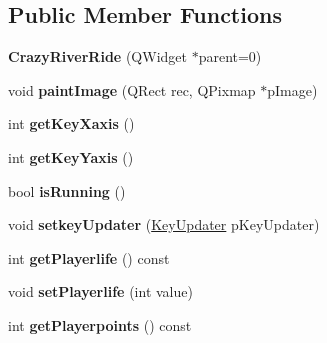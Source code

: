 \subsection*{Public Member Functions}
\begin{DoxyCompactItemize}
\item 
\hypertarget{class_crazy_river_ride_ae7676b37caf1b9f9687eb1de0b426b77}{{\bfseries Crazy\-River\-Ride} (Q\-Widget $\ast$parent=0)}\label{class_crazy_river_ride_ae7676b37caf1b9f9687eb1de0b426b77}

\item 
\hypertarget{class_crazy_river_ride_a6f69c5acd7124489c8e95024debec646}{void {\bfseries paint\-Image} (Q\-Rect rec, Q\-Pixmap $\ast$p\-Image)}\label{class_crazy_river_ride_a6f69c5acd7124489c8e95024debec646}

\item 
\hypertarget{class_crazy_river_ride_a915fc6fab259b6fa24b09e64b7710e9c}{int {\bfseries get\-Key\-Xaxis} ()}\label{class_crazy_river_ride_a915fc6fab259b6fa24b09e64b7710e9c}

\item 
\hypertarget{class_crazy_river_ride_a175a99b902ffc945943acc281fb28165}{int {\bfseries get\-Key\-Yaxis} ()}\label{class_crazy_river_ride_a175a99b902ffc945943acc281fb28165}

\item 
\hypertarget{class_crazy_river_ride_ab19f0f54728bec4069aa4c20e547be3c}{bool {\bfseries is\-Running} ()}\label{class_crazy_river_ride_ab19f0f54728bec4069aa4c20e547be3c}

\item 
\hypertarget{class_crazy_river_ride_a25bba6ef360d73e9bd2b43157f0eea0f}{void {\bfseries setkey\-Updater} (\hyperlink{class_key_updater}{Key\-Updater} p\-Key\-Updater)}\label{class_crazy_river_ride_a25bba6ef360d73e9bd2b43157f0eea0f}

\item 
\hypertarget{class_crazy_river_ride_a8e04c2ebe8c0397fada83df2bd736a80}{int {\bfseries get\-Playerlife} () const }\label{class_crazy_river_ride_a8e04c2ebe8c0397fada83df2bd736a80}

\item 
\hypertarget{class_crazy_river_ride_a6314d065ea228fd3464d41989ea56d69}{void {\bfseries set\-Playerlife} (int value)}\label{class_crazy_river_ride_a6314d065ea228fd3464d41989ea56d69}

\item 
\hypertarget{class_crazy_river_ride_a5c94c18d81438b715178bf4d27db79ac}{int {\bfseries get\-Playerpoints} () const }\label{class_crazy_river_ride_a5c94c18d81438b715178bf4d27db79ac}


\end{DoxyCompactItemize}
